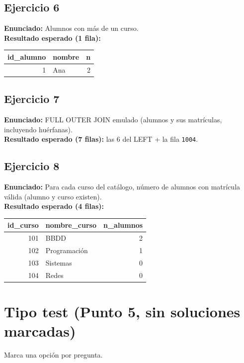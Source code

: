 \documentclass[11pt,a4paper]{article}
\begin{document}
\subsection*{Ejercicio 6}
\textbf{Enunciado:} Alumnos con más de un curso.\\
\textbf{Resultado esperado (1 fila):}
\begin{center}
\begin{tabular}{r l r}
\toprule
id\_alumno & nombre & n \\
\midrule
1 & Ana & 2 \\
\bottomrule
\end{tabular}
\end{center}

\subsection*{Ejercicio 7}
\textbf{Enunciado:} FULL OUTER JOIN emulado (alumnos y sus matrículas, incluyendo huérfanas).\\
\textbf{Resultado esperado (7 filas):} las 6 del LEFT + la fila \texttt{1004}.

\subsection*{Ejercicio 8}
\textbf{Enunciado:} Para cada curso del catálogo, número de alumnos con matrícula válida (alumno y curso existen).\\
\textbf{Resultado esperado (4 filas):}
\begin{center}
\begin{tabular}{r l r}
\toprule
id\_curso & nombre\_curso & n\_alumnos \\
\midrule
101 & BBDD         & 2 \\
102 & Programación & 1 \\
103 & Sistemas     & 0 \\
104 & Redes        & 0 \\
\bottomrule
\end{tabular}
\end{center}

\section{Tipo test (Punto 5, sin soluciones marcadas)}

Marca una opción por pregunta.
\end{document}
